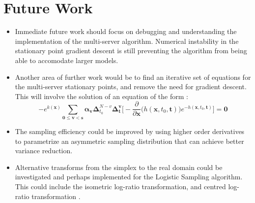 \section{Future Work}
\begin{itemize}[leftmargin=*]
    \item Immediate future work should focus on debugging and understanding the implementation of the multi-server algorithm. Numerical instability in the stationary point gradient descent is still preventing the algorithm from being able to accomodate larger models.
    \item Another area of further work would be to find an iterative set of equations for the multi-server stationary points, and remove the need for gradient descent. This will involve the solution of an equation of the form :
    \[-e^{k(\mathbf{x})} \sum_{\mathbf{0 \leq v <s}} \mathbf{\alpha_v} \boldsymbol{\Delta}_{t_0}^{N-v} \boldsymbol{\Delta}_{\mathbf{t}}^{\mathbf{v}} 
    \bigg[ -\frac{\partial}{\partial \mathbf{x}} \bigg(h(\mathbf{x}, t_0, \mathbf{t}) \bigg) e^{-h(\mathbf{x}, t_0, \mathbf{t})} \bigg] = \mathbf{0}\]
    \item The sampling efficiency could be improved by using higher order derivatives to parametrize an asymmetric sampling distribution that can achieve better variance reduction.
    \item Alternative transforms from the simplex to the real domain could be investigated and perhaps implemented for the Logistic Sampling algorithm. This could include the isometric log-ratio transformation, and centred log-ratio transformation \cite{Egozcue2003IsometricAnalysis}.
\end{itemize}
